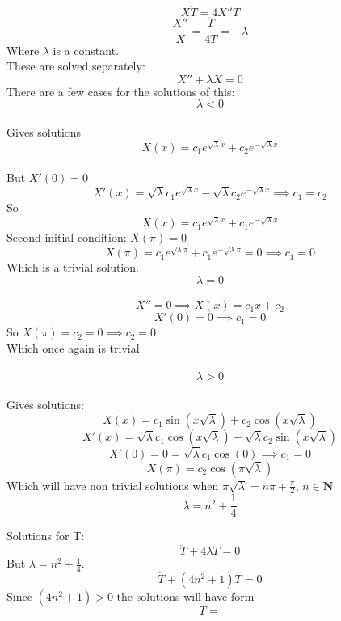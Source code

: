 \documentclass[a4paper]{article}
\begin{document}
	$$X\ddot{T}=4X''T$$
	$$\frac{X''}{X}=\frac{\ddot{T}}{4T}=-\lambda$$
	Where $\lambda$ is a constant.\\
	These are solved separately:
	$$X''+\lambda X=0$$
	There are a few cases for the solutions of this:\\
	$$\lambda < 0$$\\
	Gives solutions $$X(x)=c_1 e^{\sqrt{\lambda }x}+c_2 e^{-\sqrt{\lambda}x}$$\\
	But $X'(0)=0$\\
	$$X'(x)=\sqrt{\lambda} c_1 e^{\sqrt{\lambda }x}-\sqrt{\lambda }c_2 e^{-\sqrt{\lambda}x}\implies c_1=c_2$$
	So
	$$X(x)=c_1 e^{\sqrt{\lambda }x}+c_1
	e^{-\sqrt{\lambda}x}$$
	Second initial condition: $X(\pi)=0$\\
	$$X(\pi)=c_1 e^{\sqrt{\lambda }\pi}+c_1
	e^{-\sqrt{\lambda}\pi}=0 \implies c_1 = 0$$
	Which is a trivial solution.\\
	$$\lambda =0$$\\
	$$X''=0 \implies X(x)=c_1 x+c_2$$
	$$X'(0)=0 \implies c_1=0$$
	So $X(\pi)=c_2=0 \implies c_2=0$ 
	\\Which once again is trivial\\\\
	$$\lambda >0$$\\
	Gives solutions:
	$$X(x)=c_1\sin(x\sqrt{\lambda})+c_2\cos(x\sqrt{\lambda})$$
	$$X'(x)=\sqrt{\lambda}c_1\cos(x\sqrt{\lambda})-\sqrt{\lambda}c_2\sin(x\sqrt{\lambda})$$
	$$X'(0)=0=\sqrt{\lambda}c_1\cos(0)\implies c_1=0$$ 
	$$X(\pi)=c_2\cos(\pi\sqrt{\lambda})$$
	Which will have non trivial solutions when $\pi\sqrt{\lambda} = n\pi +\frac{\pi}{2}$, 
	$n\in \boldsymbol{N}$
	$$\lambda=n^2+\frac{1}{4}$$
	
	Solutions for T:
	$$\ddot{T}+4\lambda T=0$$
	But $\lambda = n^2+\frac{1}{4}$.\\
	$$\ddot{T}+(4n^2+1)T=0$$
	Since $(4n^2+1)>0$ the solutions will have form
	$$T=$$
	
\end{document}
